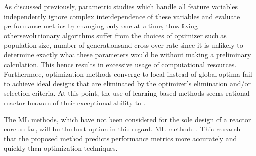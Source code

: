     As discussed previously, parametric studies which handle all feature variables independently ignore \DIFaddbegin {}\DIFaddend complex interdependence of these variables and evaluate performance metrics \DIFdelbegin {}\DIFdelend by changing only one \DIFdelbegin {}\DIFdelend \DIFaddbegin {}\DIFaddend at a time, thus fixing others\DIFdelbegin {}\DIFdelend \DIFaddbegin {}\DIFaddend evolutionary algorithms suffer from the choices of optimizer \DIFdelbegin {}\DIFdelend \DIFaddbegin {}\DIFaddend such as population size, number of generations\DIFaddbegin \DIFadd{, }\DIFaddend and cross-over rate \DIFdelbegin \DIFdel{, }\DIFdelend since it is unlikely to determine exactly what these parameters would be without making a preliminary calculation. \DIFaddbegin {}\DIFaddend This hence results in excessive usage of computational resources. Furthermore, optimization methods \DIFdelbegin {}\DIFdelend \DIFaddbegin {}\DIFaddend converge to local instead of global optima fail to achieve ideal designs that are eliminated by the optimizer's elimination and/or selection criteria. At this point, \DIFaddbegin {}\DIFaddend the use of learning-based methods seems rational \DIFdelbegin {}\DIFdelend \DIFaddbegin {}\DIFaddend reactor because of their exceptional ability to \DIFdelbegin {}\DIFdelend \DIFaddbegin {}\DIFaddend .

    The \gls{ML} methods, which have not been considered for the sole design of a reactor core so far, will be the best option in this regard. \DIFdelbegin {}\DIFdelend \DIFaddbegin {}\DIFaddend \gls{ML} methods \DIFdelbegin {}\DIFdelend \DIFaddbegin {}\DIFaddend . This research \DIFdelbegin {}\DIFdelend \DIFaddbegin {}\DIFaddend that the proposed method predicts performance metrics more accurately and quickly than \DIFdelbegin {}\DIFdelend \DIFaddbegin {}\DIFaddend optimization techniques.
